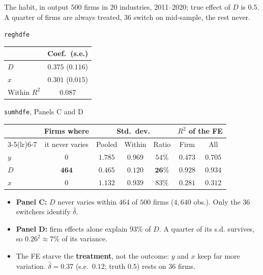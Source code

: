 \documentclass[
  11pt,
  ignorenonframetext,
  aspectratio=169,
]{beamer}
\providecommand{\tightlist}{%
  \setlength{\itemsep}{0pt}\setlength{\parskip}{0pt}}
\begin{document}
\begin{frame}{The habit, in output}
\protect{}\label{the-habit-in-output}
\(500\) firms in \(20\) industries, 2011--2020; true effect of \(D\) is
\(0.5\). A quarter of firms are always treated, \(36\) switch on
mid-sample, the rest never.

\begin{center}\footnotesize
\begin{minipage}[t]{0.30\linewidth}\centering
\texttt{reghdfe}\\[0.3em]
\begin{tabular}{lc}
\toprule
 & Coef.\ (s.e.) \\
\midrule
$D$ & $0.375$ \;($0.116$) \\
$x$ & $0.301$ \;($0.015$) \\
\midrule
Within $R^2$ & $0.087$ \\
\bottomrule
\end{tabular}
\end{minipage}\hfill
\begin{minipage}[t]{0.66\linewidth}\centering
\texttt{sumhdfe}, Panels C and D\\[0.3em]
\begin{tabular}{lcccccc}
\toprule
 & Firms where & \multicolumn{3}{c}{Std.\ dev.} & \multicolumn{2}{c}{$R^2$ of the FE} \\
\cmidrule(lr){3-5}\cmidrule(lr){6-7}
 & it never varies & Pooled & Within & Ratio & Firm & All \\
\midrule
$y$ & $0$ & $1.785$ & $0.969$ & $54\%$ & $0.473$ & $0.705$ \\
$D$ & $\mathbf{464}$ & $0.465$ & $0.120$ & $\mathbf{26\%}$ & $\mathbf{0.928}$ & $0.934$ \\
$x$ & $0$ & $1.132$ & $0.939$ & $83\%$ & $0.281$ & $0.312$ \\
\bottomrule
\end{tabular}
\end{minipage}
\end{center}

\begin{itemize}
\tightlist
\item
  \textbf{Panel C:} \(D\) never varies within \(464\) of \(500\) firms
  (\(4{,}640\) obs.). Only the \(36\) switchers identify \(\hat\delta\).
\item
  \textbf{Panel D:} firm effects alone explain \(93\%\) of \(D\). A
  quarter of its s.d. survives, so \(0.26^2 \approx 7\%\) of its
  variance.
\item
  The FE starve the \textbf{treatment}, not the outcome: \(y\) and \(x\)
  keep far more variation. \(\hat\delta = 0.37\) (s.e.~\(0.12\); truth
  \(0.5\)) rests on \(36\) firms.
\end{itemize}
\end{frame}
\end{document}
